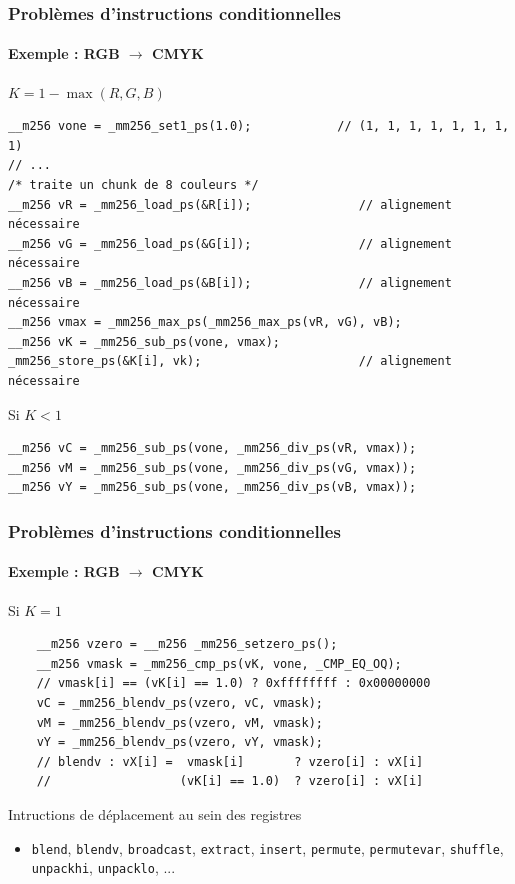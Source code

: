 \documentclass[xcolor={x11names,svgnames}]{beamer}
\begin{document}
\begin{frame}[fragile=singleslide]
  \frametitle{Problèmes d'instructions conditionnelles}
  \framesubtitle{Exemple : RGB $\rightarrow$ CMYK}

  \begin{block}{$K = 1 - \max(R, G, B)$}
\begin{verbatim}
__m256 vone = _mm256_set1_ps(1.0);            // (1, 1, 1, 1, 1, 1, 1, 1)
// ...
/* traite un chunk de 8 couleurs */
__m256 vR = _mm256_load_ps(&R[i]);               // alignement nécessaire
__m256 vG = _mm256_load_ps(&G[i]);               // alignement nécessaire
__m256 vB = _mm256_load_ps(&B[i]);               // alignement nécessaire
__m256 vmax = _mm256_max_ps(_mm256_max_ps(vR, vG), vB);
__m256 vK = _mm256_sub_ps(vone, vmax);
_mm256_store_ps(&K[i], vk);                      // alignement nécessaire
\end{verbatim}
\end{block}

  \begin{alertblock}{Si $K < 1$}
\begin{verbatim}
__m256 vC = _mm256_sub_ps(vone, _mm256_div_ps(vR, vmax));
__m256 vM = _mm256_sub_ps(vone, _mm256_div_ps(vG, vmax));
__m256 vY = _mm256_sub_ps(vone, _mm256_div_ps(vB, vmax));
\end{verbatim}
  \end{alertblock}  
\end{frame}


\begin{frame}[fragile=singleslide]
  \frametitle{Problèmes d'instructions conditionnelles}
  \framesubtitle{Exemple : RGB $\rightarrow$ CMYK}

  \begin{exampleblock}{Si $K = 1$}
\begin{verbatim}
    __m256 vzero = __m256 _mm256_setzero_ps();
    __m256 vmask = _mm256_cmp_ps(vK, vone, _CMP_EQ_OQ);
    // vmask[i] == (vK[i] == 1.0) ? 0xffffffff : 0x00000000 
    vC = _mm256_blendv_ps(vzero, vC, vmask);
    vM = _mm256_blendv_ps(vzero, vM, vmask);
    vY = _mm256_blendv_ps(vzero, vY, vmask);
    // blendv : vX[i] =  vmask[i]       ? vzero[i] : vX[i]
    //                  (vK[i] == 1.0)  ? vzero[i] : vX[i]   
\end{verbatim}
  \end{exampleblock}

  \begin{block}{Intructions de déplacement au sein des registres}
  \begin{itemize}
  \item \texttt{blend}, \texttt{blendv}, \texttt{broadcast}, \texttt{extract}, \texttt{insert}, \texttt{permute},  \texttt{permutevar}, \texttt{shuffle}, \texttt{unpackhi}, \texttt{unpacklo}, ...
  \end{itemize}
\end{block}
\end{frame}
\end{document}
